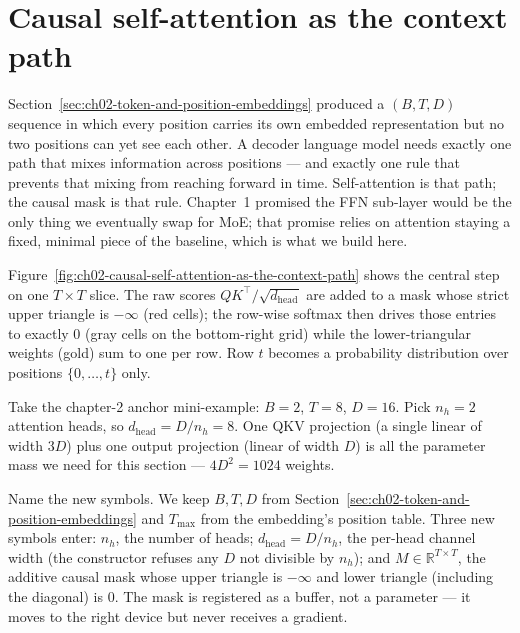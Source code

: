 \section{Causal self-attention as the context path}
\label{sec:ch02-causal-self-attention-as-the-context-path}

Section~\ref{sec:ch02-token-and-position-embeddings} produced a $(B, T, D)$ sequence in which every position carries its own embedded representation but no two positions can yet see each other. A decoder language model needs exactly one path that mixes information across positions --- and exactly one rule that prevents that mixing from reaching forward in time. Self-attention is that path; the causal mask is that rule. Chapter~1 promised the FFN sub-layer would be the only thing we eventually swap for MoE; that promise relies on attention staying a fixed, minimal piece of the baseline, which is what we build here.



Figure~\ref{fig:ch02-causal-self-attention-as-the-context-path} shows the central step on one $T \times T$ slice. The raw scores $Q K^{\top}/\sqrt{d_{\text{head}}}$ are added to a mask whose strict upper triangle is $-\infty$ (red cells); the row-wise softmax then drives those entries to exactly $0$ (gray cells on the bottom-right grid) while the lower-triangular weights (gold) sum to one per row. Row $t$ becomes a probability distribution over positions $\{0, \dots, t\}$ only.

Take the chapter-2 anchor mini-example: $B = 2$, $T = 8$, $D = 16$. Pick $n_h = 2$ attention heads, so $d_{\text{head}} = D / n_h = 8$. One QKV projection (a single linear of width $3D$) plus one output projection (linear of width $D$) is all the parameter mass we need for this section --- $4 D^2 = 1024$ weights.

Name the new symbols. We keep $B, T, D$ from Section~\ref{sec:ch02-token-and-position-embeddings} and $T_{\max}$ from the embedding's position table. Three new symbols enter: $n_h$, the number of heads; $d_{\text{head}} = D / n_h$, the per-head channel width (the constructor refuses any $D$ not divisible by $n_h$); and $M \in \mathbb{R}^{T \times T}$, the additive causal mask whose upper triangle is $-\infty$ and lower triangle (including the diagonal) is $0$. The mask is registered as a buffer, not a parameter --- it moves to the right device but never receives a gradient.



